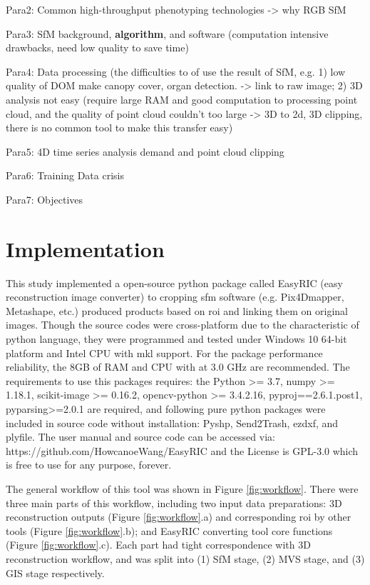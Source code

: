 \documentclass{configs/bmcart}
\begin{document}
Para2: Common high-throughput phenotyping technologies -> why RGB SfM

Para3: SfM background, \textbf{algorithm}, and software (computation intensive drawbacks, need low quality to save time)

Para4: Data processing (the difficulties to of use the result of SfM, e.g. 1) low quality of DOM make canopy cover, organ detection. -> link to raw image; 2) 3D analysis not easy (require large RAM and good computation to processing point cloud, and the quality of point cloud couldn't too large -> 3D to 2d, 3D clipping, there is no common tool to make this transfer easy)


Para5: 4D time series analysis demand and point cloud clipping

Para6: Training Data crisis

Para7: Objectives

\section*{Implementation}

This study implemented a open-source python \cite{guido_python_2020} package called EasyRIC (easy reconstruction image converter) to cropping \acrshort*{sfm} software (e.g. Pix4Dmapper, Metashape, etc.) produced products based on \acrfull*{roi} and linking them on original images. Though the source codes were cross-platform due to the characteristic of python language, they were programmed and tested under Windows 10 64-bit platform and Intel CPU with \acrfull*{mkl} support. For the package performance reliability, the 8GB of RAM and CPU with at 3.0 GHz are recommended. The requirements to use this packages requires: the Python >= 3.7, numpy >= 1.18.1, scikit-image >= 0.16.2, opencv-python >= 3.4.2.16, pyproj==2.6.1.post1, pyparsing>=2.0.1 are required, and following pure python packages were included in source code without installation: Pyshp, Send2Trash, ezdxf, and plyfile. The user manual and source code can be accessed via: https://github.com/HowcanoeWang/EasyRIC and the License is GPL-3.0 which is free to use for any purpose, forever.

The general workflow of this tool was shown in Figure \ref{fig:workflow}. There were three main parts of this workflow, including two input data preparations: 3D reconstruction outputs (Figure \ref{fig:workflow}.a) and corresponding \acrfull*{roi} by other tools (Figure \ref{fig:workflow}.b); and EasyRIC converting tool core functions (Figure \ref{fig:workflow}.c). Each part had tight correspondence with 3D reconstruction workflow, and was split into (1) SfM stage, (2) MVS stage, and (3) GIS stage respectively. 
\end{document}
